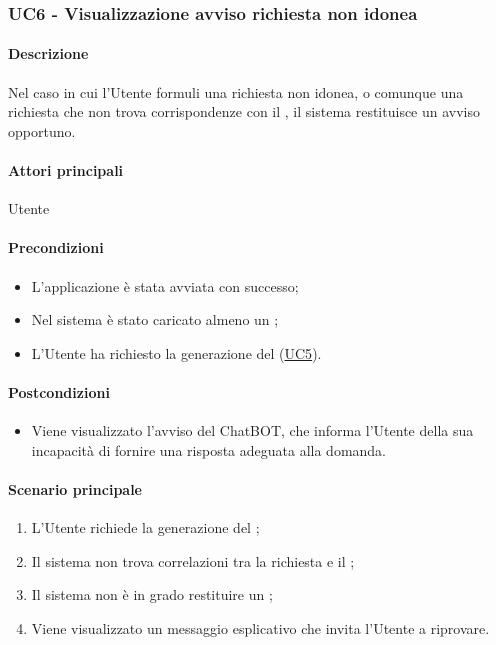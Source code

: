 \subsubsection{UC6 - Visualizzazione avviso richiesta non idonea}\label{UC6}
\paragraph*{Descrizione}
Nel caso in cui l'Utente formuli una richiesta non idonea, o comunque una richiesta che non trova corrispondenze con il , il sistema restituisce un avviso opportuno.

\paragraph*{Attori principali}
Utente

\paragraph*{Precondizioni}
\begin{itemize}
  \item L'applicazione è stata avviata con successo;
  \item Nel sistema è stato caricato almeno un ;
  \item L'Utente ha richiesto la generazione del  (\hyperref[UC5]{UC5}).  
\end{itemize}

\paragraph*{Postcondizioni}
\begin{itemize}
  \item Viene visualizzato l'avviso del ChatBOT, che informa l'Utente della sua incapacità di fornire una risposta adeguata alla domanda.
\end{itemize}

\paragraph*{Scenario principale}
\begin{enumerate}
  \item L'Utente richiede la generazione del ;
  \item Il sistema non trova correlazioni tra la richiesta e il ;
  \item Il sistema non è in grado restituire un ;
  \item Viene visualizzato un messaggio esplicativo che invita l'Utente a riprovare.
\end{enumerate}